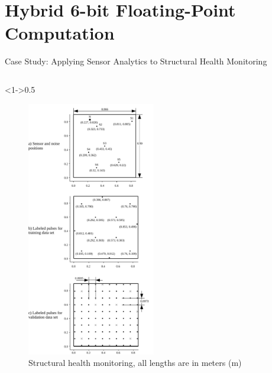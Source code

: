 \section{Hybrid 6-bit Floating-Point Computation}
\tableofcontents[currentsection]


\begin{frame}{Case Study: Applying Sensor Analytics to Structural Health Monitoring}
	\begin{columns}[t] %
		
		\begin{column}<1->{0.5\textwidth}\centering
			\begin{figure}
				\includegraphics[width=0.5\textwidth]{../chapters/cnn_accelerator/figures/histograms/data_set.pdf} %
				\caption{ Structural health monitoring, all lengths are in meters (m)}
			\end{figure}
		\end{column}
		

\end{columns}
\end{frame}
